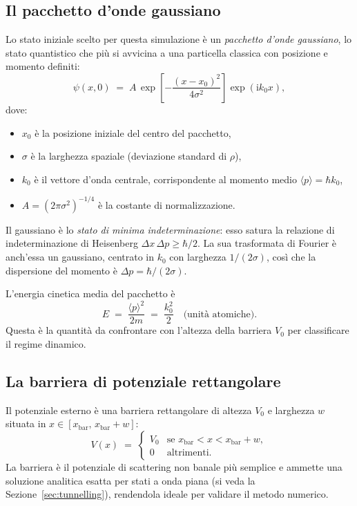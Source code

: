 \documentclass[12pt, a4paper]{article}
\newcommand{\ii}{\mathrm{i}}          %
\begin{document}
\subsection{Il pacchetto d'onde gaussiano}

Lo stato iniziale scelto per questa simulazione è un \emph{pacchetto d'onde
gaussiano}, lo stato quantistico che più si avvicina a una particella classica
con posizione e momento definiti:
\begin{equation}
  \psi(x,0) \;=\; A\,\exp\!\left[-\frac{(x-x_0)^2}{4\sigma^2}\right]
  \exp\!\left(\ii k_0 x\right),
  \label{eq:gauss}
\end{equation}
dove:
\begin{itemize}
  \item $x_0$ è la posizione iniziale del centro del pacchetto,
  \item $\sigma$ è la larghezza spaziale (deviazione standard di $\rho$),
  \item $k_0$ è il vettore d'onda centrale, corrispondente al momento medio
        $\langle p\rangle = \hbar k_0$,
  \item $A = (2\pi\sigma^2)^{-1/4}$ è la costante di normalizzazione.
\end{itemize}

Il gaussiano è lo \emph{stato di minima indeterminazione}: esso satura
la relazione di indeterminazione di Heisenberg $\Delta x\,\Delta p \geq \hbar/2$.
La sua trasformata di Fourier è anch'essa un gaussiano, centrato in $k_0$
con larghezza $1/(2\sigma)$, così che la dispersione del momento è
$\Delta p = \hbar/(2\sigma)$.

L'energia cinetica media del pacchetto è
\begin{equation}
  E \;=\; \frac{\langle p\rangle^2}{2m} \;=\; \frac{k_0^2}{2}
  \quad \text{(unità atomiche)}.
  \label{eq:energy}
\end{equation}
Questa è la quantità da confrontare con l'altezza della barriera $V_0$ per
classificare il regime dinamico.

\subsection{La barriera di potenziale rettangolare}

Il potenziale esterno è una barriera rettangolare di altezza $V_0$ e
larghezza $w$ situata in $x \in [x_\text{bar},\, x_\text{bar}+w]$:
\begin{equation}
  V(x) \;=\;
  \begin{cases}
    V_0 & \text{se } x_\text{bar} < x < x_\text{bar} + w, \\
    0   & \text{altrimenti.}
  \end{cases}
  \label{eq:barrier}
\end{equation}
La barriera è il potenziale di scattering non banale più semplice e ammette
una soluzione analitica esatta per stati a onda piana (si veda la
Sezione~\ref{sec:tunnelling}), rendendola ideale per validare il metodo
numerico.
\end{document}
